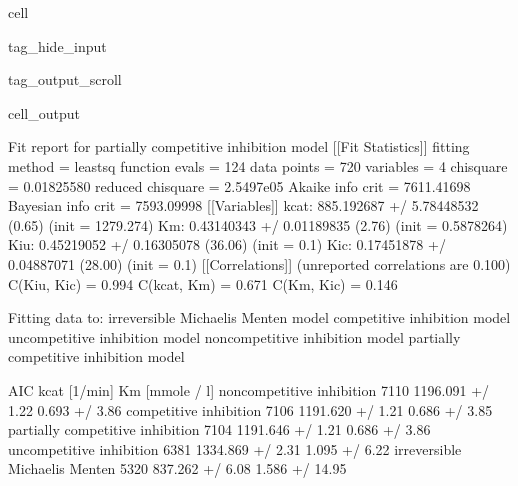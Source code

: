 \documentclass[letterpaper,10pt,english]{jupyterBook}
\begin{document}
\begin{sphinxuseclass}{cell}
\begin{sphinxuseclass}{tag_hide_input}
\begin{sphinxuseclass}{tag_output_scroll}
\begin{sphinxVerbatimOutput}
\begin{sphinxuseclass}{cell_output}
\begin{sphinxVerbatim}[commandchars=\\\{\}]
Fit report for partially competitive inhibition model
[[Fit Statistics]]
    \PYGZsh{} fitting method   = leastsq
    \PYGZsh{} function evals   = 124
    \PYGZsh{} data points      = 720
    \PYGZsh{} variables        = 4
    chi\PYGZhy{}square         = 0.01825580
    reduced chi\PYGZhy{}square = 2.5497e\PYGZhy{}05
    Akaike info crit   = \PYGZhy{}7611.41698
    Bayesian info crit = \PYGZhy{}7593.09998
[[Variables]]
    k\PYGZus{}cat:  885.192687 +/\PYGZhy{} 5.78448532 (0.65\PYGZpc{}) (init = 1279.274)
    Km:     0.43140343 +/\PYGZhy{} 0.01189835 (2.76\PYGZpc{}) (init = 0.5878264)
    K\PYGZus{}iu:   0.45219052 +/\PYGZhy{} 0.16305078 (36.06\PYGZpc{}) (init = 0.1)
    K\PYGZus{}ic:   0.17451878 +/\PYGZhy{} 0.04887071 (28.00\PYGZpc{}) (init = 0.1)
[[Correlations]] (unreported correlations are \PYGZlt{} 0.100)
    C(K\PYGZus{}iu, K\PYGZus{}ic) = 0.994
    C(k\PYGZus{}cat, Km)  = 0.671
    C(Km, K\PYGZus{}ic)   = 0.146
\end{sphinxVerbatim}

\noindent{}

\begin{sphinxVerbatim}[commandchars=\\\{\}]
Fitting data to:
 \PYGZhy{} irreversible Michaelis Menten model
 \PYGZhy{} competitive inhibition model
 \PYGZhy{} uncompetitive inhibition model
 \PYGZhy{} non\PYGZhy{}competitive inhibition model
 \PYGZhy{} partially competitive inhibition model
\end{sphinxVerbatim}

\begin{sphinxVerbatim}[commandchars=\\\{\}]
                                   AIC        kcat [1/min]    Km [mmole / l]  \PYGZbs{}
non\PYGZhy{}competitive inhibition       \PYGZhy{}7110  1196.091 +/\PYGZhy{} 1.22\PYGZpc{}   0.693 +/\PYGZhy{} 3.86\PYGZpc{}   
competitive inhibition           \PYGZhy{}7106  1191.620 +/\PYGZhy{} 1.21\PYGZpc{}   0.686 +/\PYGZhy{} 3.85\PYGZpc{}   
partially competitive inhibition \PYGZhy{}7104  1191.646 +/\PYGZhy{} 1.21\PYGZpc{}   0.686 +/\PYGZhy{} 3.86\PYGZpc{}   
uncompetitive inhibition         \PYGZhy{}6381  1334.869 +/\PYGZhy{} 2.31\PYGZpc{}   1.095 +/\PYGZhy{} 6.22\PYGZpc{}   
irreversible Michaelis Menten    \PYGZhy{}5320   837.262 +/\PYGZhy{} 6.08\PYGZpc{}  1.586 +/\PYGZhy{} 14.95\PYGZpc{}   


\end{sphinxVerbatim}
\end{sphinxuseclass}
\end{sphinxVerbatimOutput}
\end{sphinxuseclass}
\end{sphinxuseclass}
\end{sphinxuseclass}
\end{document}
